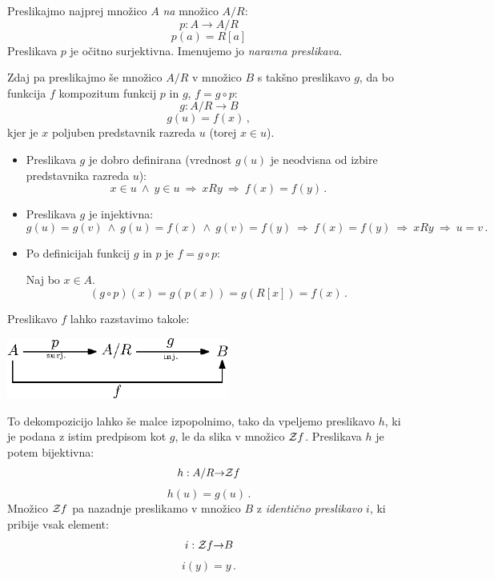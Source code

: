\documentclass[11pt,paper=b5,footinclude,headinclude]{scrbook} %
\def\inn {{~\wedge~}}
\def\sledi {{~\Rightarrow~}}
\def\cee {{~\Leftrightarrow~}}
\begin{document}
Preslikajmo najprej množico $A$ {\em na} množico  $A/R$:
$$p:A{\to} A/R$$
$$p(a) = R[a]$$
Preslikava $p$ je očitno surjektivna. Imenujemo jo {\em naravna preslikava}.

Zdaj pa preslikajmo še množico $A/R$ v množico $B$ s takšno preslikavo $g$, da bo
funkcija $f$ kompozitum funkcij $p$ in $g$, $f = g\circ p$:
$$g:A/R{\to} B$$
$$g(u) = f(x)\,,$$
kjer je $x$ poljuben predstavnik razreda $u$ (torej $x\in u$).

\begin{itemize}
  \item Preslikava $g$ je dobro definirana (vrednost $g(u)$ je neodvisna od izbire predstavnika razreda $u$):
$$x\in u\inn y\in u \sledi xRy \sledi f(x) = f(y)\,.$$
  \item Preslikava $g$ je injektivna:
$$g(u) = g(v) \inn g(u) = f(x) \inn g(v) = f(y) \sledi f(x) = f(y) \sledi xRy \sledi  u = v\,.$$
  \item Po definicijah funkcij $g$ in $p$ je $f = g\circ p$:

Naj bo $x\in A$.
$$(g\circ p)(x) = g(p(x)) = g(R[x]) = f(x)\,.$$
\end{itemize}

Preslikavo $f$ lahko razstavimo takole:
\begin{center}
\includegraphics[height=20mm]{dekompozicija.eps}
\end{center}

To dekompozicijo lahko še malce izpopolnimo, tako da vpeljemo preslikavo $h$, ki
je podana z istim predpisom kot $g$, le da slika v množico ${\cal Z}f$. Preslikava $h$ je potem bijektivna:
$$h:A/R{\to} {\cal Z}f$$
$$h(u) = g(u)\,.$$
Množico ${\cal Z}f$ pa nazadnje preslikamo v množico $B$ z {\em identično preslikavo} $i$, ki pribije vsak element:
$$i:{\cal Z}f{\to}B$$
$$i(y) = y\,.$$
\end{document}
